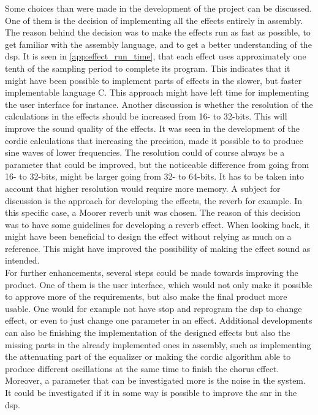 Some choices than were made in the development of the project can be discussed. One of them is the decision of implementing all the effects entirely in assembly. The reason behind the decision was to make the effects run as fast as possible, to get familiar with the assembly language, and to get a better understanding of the \gls{dsp}. It is seen in \autoref{app:effect_run_time}, that each effect uses approximately one tenth of the sampling period to complete its program. This indicates that it might have been possible to implement parts of effects in the slower, but faster implementable language C. This approach might have left time for implementing the user interface for instance. 
Another discussion is whether the resolution of the calculations in the effects should be increased from 16- to 32-bits. This will improve the sound quality of the effects. It was seen in the development of the \gls{cordic} calculations that increasing the precision, made it possible to to produce sine waves of lower frequencies. The resolution could of course always be a parameter that could be improved, but the noticeable difference from going from 16- to 32-bits, might be larger going from 32- to 64-bits. It has to be taken into account that higher resolution would require more memory.  
A subject for discussion is the approach for developing the effects, the \gls{reverb} for example. In this specific case, a Moorer \gls{reverb} unit was chosen. The reason of this decision was to have some guidelines for developing a \gls{reverb} effect. When looking back, it might have been beneficial to design the effect without relying as much on a reference. This might have improved the possibility  of making the effect sound as intended. \\

For further enhancements, several steps could be made towards improving the product. One of them is the user interface, which would not only make it possible to approve more of the requirements, but also make the final product more usable. One would for example not have stop and reprogram the \gls{dsp} to change effect, or even to just change one parameter in an effect. 
Additional developments can also be finishing the implementation of the designed effects but also the missing parts in the already implemented ones in assembly, such as implementing the attenuating part of the equalizer or making the \gls{cordic} algorithm able to produce different oscillations at the same time to finish the chorus effect. 
Moreover, a parameter that can be investigated more is the noise in the system. It could be investigated if it in some way is possible to improve the \gls{snr} in the \gls{dsp}.